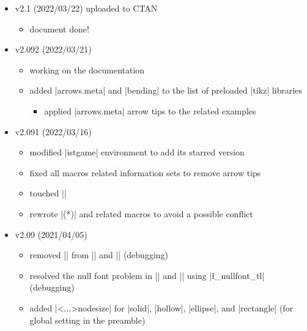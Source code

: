 \documentclass[a4paper,amsmath]{oblivoir}
\newcommand\pkg[1]{\textsf{#1}}
\begin{document}
\begin{itemize}
\item v2.1 (2022/03/22) uploaded to CTAN
  \begin{itemize}
  \item document done!
  \end{itemize}
\item v2.092 (2022/03/21)
  \begin{itemize}
  \item working on the documentation
  \item added |arrows.meta| and |bending| to the list of preloaded |tikz| libraries
    \begin{itemize}
    \item applied |arrows.meta| arrow tips to the related examples
    \end{itemize}
  \end{itemize}
\item v2.091 (2022/03/16)
  \begin{itemize}
  \item modified |istgame| environment to add its starred version
  \item fixed all macros related information sets to remove arrow tips
  \item touched |\AtBeginDocument{\setxtarrowtips}|
  \item rewrote |\setistmathTF(*)| and related macros to avoid a possible conflict
  \end{itemize}
\item v2.09 (2021/04/05)
  \begin{itemize}
  \item removed |\pgfextra| from |\istrootcntm| and |\istrootcntmA| (debugging)
  \item resolved the null font problem in |\cntmistb| and |\cntmAistb| using |\l_nullfont_tl| (debugging)
  \item added |\setist<...>nodesize| for |solid|, |hollow|, |ellipse|, and |rectangle| (for global setting in the preamble)

\end{itemize}
\end{itemize}
\end{document}
